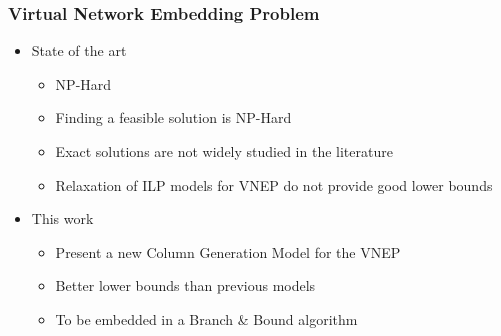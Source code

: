 \documentclass[english]{beamer}
\begin{document}
\begin{frame}
\frametitle{Virtual Network Embedding Problem}
\begin{itemize}
	\item State of the art
    \begin{itemize}
      \item NP-Hard
      \item Finding a feasible solution is NP-Hard
      \item Exact solutions are not widely studied in the literature
      \item Relaxation of ILP models for VNEP do not provide good lower bounds
    \end{itemize}
	\item This work
    \begin{itemize}
      \item Present a new Column Generation Model for the VNEP
      \item Better lower bounds than previous models
      \item To be embedded in a Branch \& Bound algorithm
    \end{itemize}
\end{itemize}
\end{frame}

\end{document}
